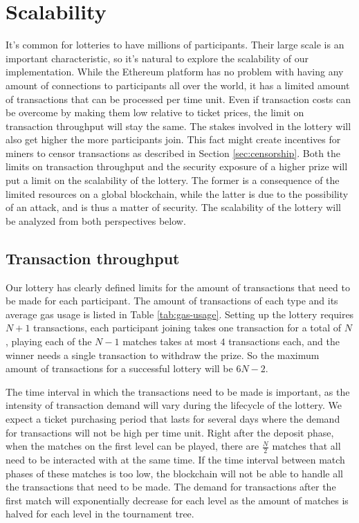 \section{Scalability}
\label{sec:scalability}

It's common for lotteries to have millions of participants. Their large scale is an important characteristic, so it's natural to explore the scalability of our implementation. While the Ethereum platform has no problem with having any amount of connections to participants all over the world, it has a limited amount of transactions that can be processed per time unit. Even if transaction costs can be overcome by making them low relative to ticket prices, the limit on transaction throughput will stay the same. The stakes involved in the lottery will also get higher the more participants join. This fact might create incentives for miners to censor transactions as described in Section \ref{sec:censorship}. 
Both the limits on transaction throughput and the security exposure of a higher prize will put a limit on the scalability of the lottery. The former is a consequence of the limited resources on a global blockchain, while the latter is due to the possibility of an attack, and is thus a matter of security. The scalability of the lottery will be analyzed from both perspectives below.

\subsection{Transaction throughput}

Our lottery has clearly defined limits for the amount of transactions that need to be made for each participant. The amount of transactions of each type and its average gas usage is listed in Table \ref{tab:gas-usage}. Setting up the lottery requires $N+1$ transactions, each participant joining takes one transaction for a total of $N$, playing each of the $N-1$ matches takes at most $4$ transactions each, and the winner needs a single transaction to withdraw the prize. So the maximum amount of transactions for a successful lottery will be $6N-2$.  

The time interval in which the transactions need to be made is important, as the intensity of transaction demand will vary during the lifecycle of the lottery. We expect a ticket purchasing period that lasts for several days where the demand for transactions will not be high per time unit. Right after the deposit phase, when the matches on the first level can be played, there are $\frac{N}{2}$ matches that all need to be interacted with at the same time. If the time interval between match phases of these matches is too low, the blockchain will not be able to handle all the transactions that need to be made. The demand for transactions after the first match will exponentially decrease for each level as the amount of matches is halved for each level in the tournament tree.

